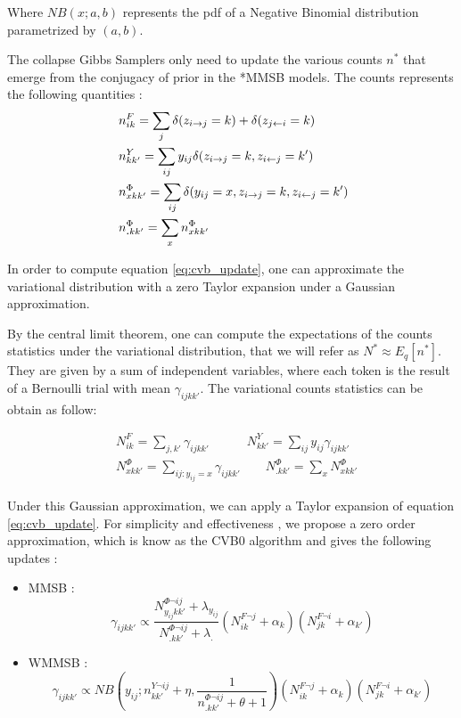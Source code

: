 Where $NB(x;a, b)$ represents the pdf of a Negative Binomial distribution parametrized by $(a,b)$.

The collapse Gibbs Samplers only need to update the various counts $n^*$ that emerge from the conjugacy of prior in the *MMSB models. The counts represents the following quantities :
\begin{align}
&n^{F}_{ik} = \sum_j \delta(\zij=k) + \delta(z_{j\leftarrow i}=k) \\  
&n^{Y}_{kk'} = \sum_{ij} y_{ij}\delta(\zij=k, \zji=k') \\
&n^{\Phi}_{xkk'} = \sum_{ij} \delta(y_{ij}=x, \zij=k, \zji=k') \\
&n^{\Phi}_{\bm{.}kk'} = \sum_x n^{\Phi}_{xkk'}
\end{align}

In order to compute equation \eqref{eq:cvb_update}, one can approximate the variational distribution with a zero Taylor expansion under a Gaussian approximation. 

By the central limit theorem, one can compute the expectations of the counts statistics under the variational distribution, that we will refer as $N^* \approx E_q[n^*]$. They are given by a sum of independent variables, where each token is the result of a Bernoulli trial with mean $\gamma_{ijkk'}$. The variational counts statistics can be obtain as follow:

\begin{align} \label{eq:stat_cvb}
    &N^{F}_{ik} = \sum_{j, k'} \gamma_{ijkk'} \qquad\quad  N^{Y}_{kk'} = \sum_{ij} y_{ij}\gamma_{ijkk'} \\
    &N^{\Phi}_{xkk'} = \sum_{ij:y_{ij}=x} \gamma_{ijkk'} \qquad  N^{\Phi}_{\bm{.}kk'} = \sum_x N^{\Phi}_{xkk'}
\end{align}

Under this Gaussian approximation, we can apply a Taylor expansion of equation \eqref{eq:cvb_update}. For simplicity and effectiveness \cite{asuncion2009smoothing}, we propose a zero order approximation, which is know as the CVB0 algorithm and gives the following updates :

\begin{itemize}
    \item MMSB : \[ \gamma_{ijkk'} \propto  \frac{ N^{\Phi\neg ij}_{y_{ij}kk'} + \lambda_{y_{ij}}}{N^{\Phi\neg ij}_{\bm{.}kk'} + \lambda_{\bm{.}}} (N^{F\neg j}_{ik} + \alpha_k) (N^{F\neg i}_{jk} + \alpha_{k'})\]
    \item WMMSB : \[ \gamma_{ijkk'} \propto NB(y_{ij}; n^{Y\neg ij}_{kk'} + \eta, \frac{1}{n^{\Phi\neg ij}_{\bm{.}kk'} + \theta + 1} ) (N^{F\neg j}_{ik} + \alpha_k) (N^{F\neg i}_{jk} + \alpha_{k'})\]
\end{itemize}

